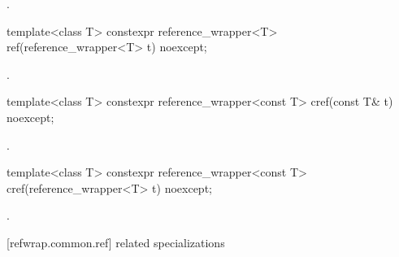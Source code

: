 \begin{itemdescr}
\pnum
\returns
{}.
\end{itemdescr}

%
\begin{itemdecl}
template<class T> constexpr reference_wrapper<T> ref(reference_wrapper<T> t) noexcept;
\end{itemdecl}

\begin{itemdescr}
\pnum
\returns
{}.
\end{itemdescr}

%
\begin{itemdecl}
template<class T> constexpr reference_wrapper<const T> cref(const T& t) noexcept;
\end{itemdecl}

\begin{itemdescr}
\pnum
\returns
{}.
\end{itemdescr}

%
\begin{itemdecl}
template<class T> constexpr reference_wrapper<const T> cref(reference_wrapper<T> t) noexcept;
\end{itemdecl}

\begin{itemdescr}
\pnum
\returns
{}.
\end{itemdescr}

[refwrap.common.ref]{ related specializations}

